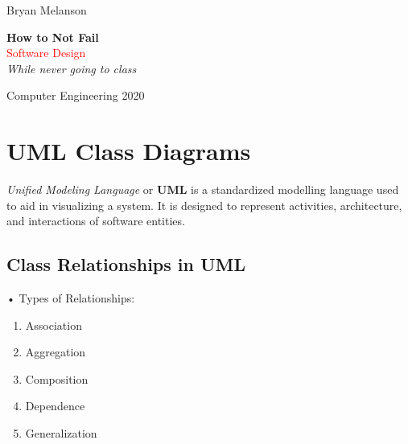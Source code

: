 \documentclass[11pt]{article}
\newcommand*{\plogo}{\fbox{$\mathcal{BM}$}}
\begin{document}
 
        
    \begin{titlepage}
    
        \raggedleft
        
        \vspace*{\baselineskip}
        
        {\Large Bryan Melanson}
        
        \vspace*{0.167\textheight}
        
        \textbf{\LARGE How to Not Fail}\\[\baselineskip]
        
        {\textcolor{Red}{\Huge Software Design}}\\[\baselineskip]
        
        {\Large \textit{While never going to class}}
        
        \vfill
        
        {\large Computer Engineering 2020 ~~\plogo}
        
        \vspace*{3\baselineskip}
    
    \end{titlepage}

    \pagebreak
    

\tableofcontents

\pagebreak

\section{UML Class Diagrams}

\textit{Unified Modeling Language} or \textbf{UML} is a standardized modelling language used to aid in visualizing a system. It is designed to represent activities, architecture, and interactions of software entities.

\subsection{Class Relationships in UML}
• Types of Relationships:
\begin{enumerate}
    \item{Association}
    \item{Aggregation}
    \item{Composition}
    \item{Dependence}
    \item{Generalization}
\end{enumerate}
\end{document}
